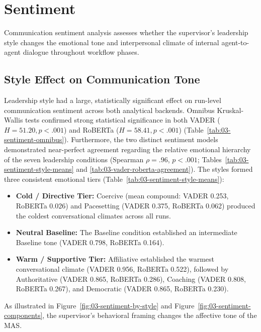 \section{Sentiment}
\label{sec:results-sentiment}

Communication sentiment analysis assesses whether the supervisor's leadership style changes the emotional tone and interpersonal climate of internal agent-to-agent dialogue throughout workflow phases.

\subsection{Style Effect on Communication Tone}
\label{subsec:style-effect-tone}

Leadership style had a large, statistically significant effect on run-level communication sentiment across both analytical backends.
Omnibus Kruskal-Wallis tests confirmed strong statistical significance in both \ac{VADER} ($H = 51.20, p < .001$) and \ac{RoBERTa} ($H = 58.41, p < .001$) (Table~\ref{tab:03-sentiment-omnibus}).
Furthermore, the two distinct sentiment models demonstrated near-perfect agreement regarding the relative emotional hierarchy of the seven leadership conditions (Spearman $\rho = .96$, $p < .001$; Tables~\ref{tab:03-sentiment-style-means} and \ref{tab:03-vader-roberta-agreement}).
The styles formed three consistent emotional tiers (Table~\ref{tab:03-sentiment-style-means}):
\begin{itemize}
    \item \textbf{Cold / Directive Tier:} Coercive (mean compound: \ac{VADER} 0.253, \ac{RoBERTa} 0.026) and Pacesetting (\ac{VADER} 0.375, \ac{RoBERTa} 0.062) produced the coldest conversational climates across all runs.
    \item \textbf{Neutral Baseline:} The Baseline condition established an intermediate Baseline tone (\ac{VADER} 0.798, \ac{RoBERTa} 0.164).
    \item \textbf{Warm / Supportive Tier:} Affiliative established the warmest conversational climate (\ac{VADER} 0.956, \ac{RoBERTa} 0.522), followed by Authoritative (\ac{VADER} 0.865, \ac{RoBERTa} 0.286), Coaching (\ac{VADER} 0.808, \ac{RoBERTa} 0.267), and Democratic (\ac{VADER} 0.865, \ac{RoBERTa} 0.230).
\end{itemize}
As illustrated in Figure~\ref{fig:03-sentiment-by-style} and Figure~\ref{fig:03-sentiment-components}, the supervisor's behavioral framing changes the affective tone of the \ac{MAS}.

